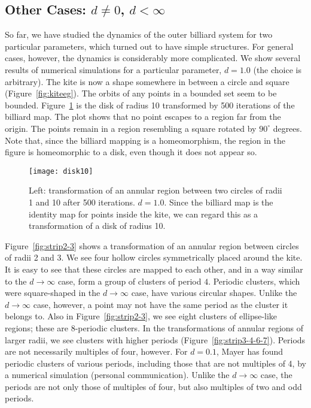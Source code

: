 \documentclass[10pt,twoside]{book}
\begin{document}
\subsection*{Other Cases: $d \neq 0$, $d < \infty$}
So far, we have studied the dynamics of the outer billiard system for two particular parameters, which turned out to have simple structures.
For general cases, however, the dynamics is considerably more complicated.
We show several results of numerical simulations for a particular parameter, $d = 1.0$ (the choice is arbitrary).
The kite is now a shape somewhere in between a circle and square (Figure~\ref{fig:kiteeg}).
The orbits of any points in a bounded set seem to be bounded.
Figure~\ref{fig:disk10} is the disk of radius 10 transformed by 500 iterations of the billiard map.
The plot shows that no point escapes to a region far from the origin.
The points remain in a region resembling a square rotated by $90^\circ$ degrees.
Note that, since the billiard mapping is a homeomorphism, the region in the figure is homeomorphic to a disk, even though it does not appear so.
\begin{figure}[ht]
  \begin{center}
    \texttt{[image: disk10]}
    \caption{Left: transformation of an annular region between two circles of radii 1 and 10 after 500 iterations.
      $d = 1.0$.
      Since the billiard map is the identity map for points inside the kite, we can regard this as a transformation of a disk of radius 10.
    }
    \label{fig:disk10}
  \end{center}
\end{figure}

Figure~\ref{fig:strip2-3} shows a transformation of an annular region between circles of radii 2 and 3.
We see four hollow circles symmetrically placed around the kite.
It is easy to see that these circles are mapped to each other, and in a way similar to the $d \to \infty$ case, form a group of clusters of period $4$.
Periodic clusters, which were square-shaped in the $d \to \infty$ case, have various circular shapes.
Unlike the $d \to \infty$ case, however, a point may not have the same period as the cluster it belongs to.
Also in Figure~\ref{fig:strip2-3}, we see eight clusters of ellipse-like regions; these are 8-periodic clusters.
In the transformations of annular regions of larger radii, we see clusters with higher periods (Figure~\ref{fig:strip3-4-6-7}).
Periods are not necessarily multiples of four, however.
For $d = 0.1$, Mayer has found periodic clusters of various periods, including those that are not multiples of 4, by a numerical simulation (personal communication).
Unlike the $d \to \infty$ case, the periods are not only those of multiples of four, but also multiples of two and odd periods.
\end{document}
